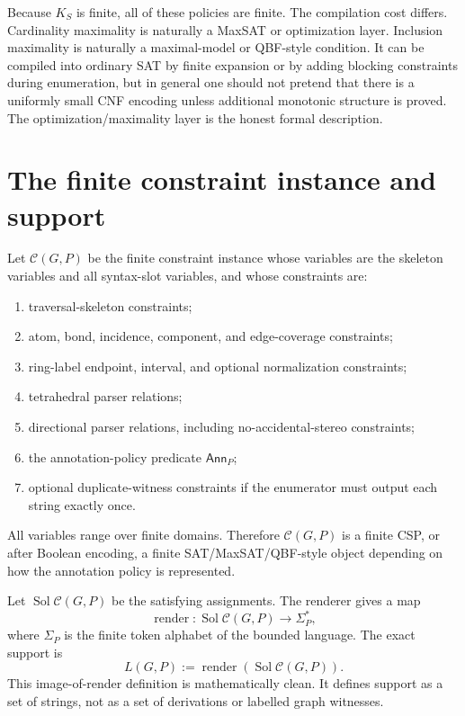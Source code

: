 \documentclass[10pt,a4paper]{article}
\newcommand{\calC}{\mathcal C}
\newcommand{\Sol}{\operatorname{Sol}}
\newcommand{\render}{\operatorname{render}}
\newcommand{\Ann}{\mathsf{Ann}}
\theoremstyle{definition}
\theoremstyle{remark}
\begin{document}
	Because \(K_S\) is finite, all of these policies are finite.  The compilation
	cost differs.  Cardinality maximality is naturally a MaxSAT or optimization
	layer.  Inclusion maximality is naturally a maximal-model or QBF-style
	condition.  It can be compiled into ordinary SAT by finite expansion or by
	adding blocking constraints during enumeration, but in general one should not
	pretend that there is a uniformly small CNF encoding unless additional monotonic
	structure is proved.  The optimization/maximality layer is the honest formal
	description.

	\section{The finite constraint instance and support}
	\label{s:instance}

	Let \(\calC(G,P)\) be the finite constraint instance whose variables are the
	skeleton variables and all syntax-slot variables, and whose constraints are:
	\begin{enumerate}[label=\textup{(C\arabic*)},leftmargin=2.5em]
		\item traversal-skeleton constraints;
		\item atom, bond, incidence, component, and edge-coverage constraints;
		\item ring-label endpoint, interval, and optional normalization constraints;
		\item tetrahedral parser relations;
		\item directional parser relations, including no-accidental-stereo constraints;
		\item the annotation-policy predicate \(\Ann_P\);
		\item optional duplicate-witness constraints if the enumerator must output each
		string exactly once.
	\end{enumerate}
	All variables range over finite domains.  Therefore \(\calC(G,P)\) is a finite
	CSP, or after Boolean encoding, a finite SAT/MaxSAT/QBF-style object depending
	on how the annotation policy is represented.

	Let \(\Sol\calC(G,P)\) be the satisfying assignments.  The renderer gives a map
	\[
	\render:\Sol\calC(G,P)\longrightarrow\Sigma_P^*,
	\]
	where \(\Sigma_P\) is the finite token alphabet of the bounded language.  The
	exact support is
	\[
	L(G,P):=\render(\Sol\calC(G,P)).
	\]
	This image-of-render definition is mathematically clean.  It defines support as
	a set of strings, not as a set of derivations or labelled graph witnesses.
\end{document}
